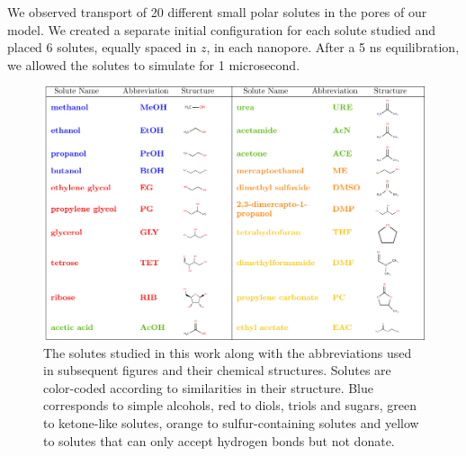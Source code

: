 \documentclass{article}
\begin{document}
  We observed transport of 20 different small polar solutes in the pores of
  our model. We created a separate initial configuration for each solute 
  studied and placed 6 solutes, equally spaced in $z$, in each nanopore.
  After a 5 ns equilibration, we allowed the solutes to simulate for
  1 microsecond. 
  
  \begin{figure}
  \includegraphics[width=\textwidth]{solute_table.pdf}
  \caption{The solutes studied in this work along with the abbreviations used
  in subsequent figures and their chemical structures. Solutes are color-coded
  according to similarities in their structure. Blue corresponds to simple 
  alcohols, red to diols, triols and sugars, green to ketone-like solutes, 
  orange to sulfur-containing solutes and yellow to solutes that can only accept
  hydrogen bonds but not donate.}\label{fig:solute_table}
  \vspace{-0.5cm}
  \end{figure}

  
\end{document}
